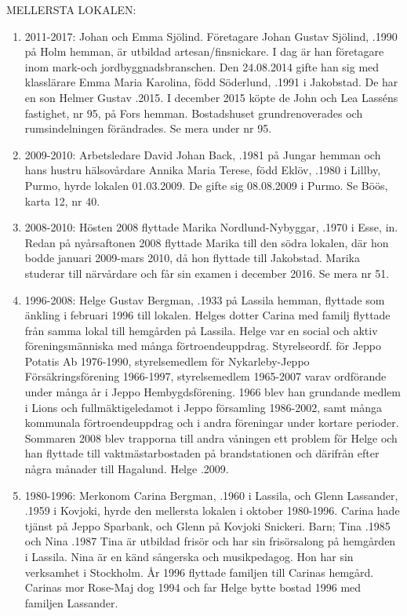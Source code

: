 MELLERSTA LOKALEN:
\begin{enumerate}
  \item 2011-2017: Johan och Emma Sjölind. Företagare Johan Gustav Sjölind, .1990 på Holm hemman, är utbildad artesan/finsnickare. I dag är han företagare inom mark-och jordbyggnadsbranschen. Den 24.08.2014 gifte han sig med klasslärare Emma Maria Karolina, född Söderlund, .1991 i Jakobstad. De har	en son Helmer Gustav .2015. I december 2015 köpte de John och Lea Lasséns fastighet, nr 95, på Fors hemman. Bostadshuset grundrenoverades och rumsindelningen förändrades. Se mera under nr 95.
  \item 2009-2010: Arbetsledare David Johan Back, .1981 på Jungar hemman och hans hustru hälsovårdare Annika Maria Terese, född Eklöv, .1980 i Lillby, Purmo, hyrde lokalen 01.03.2009. De gifte sig 08.08.2009 i Purmo. Se Böös, karta 12, nr 40.
  \item 2008-2010: 	Hösten 2008 flyttade Marika Nordlund-Nybyggar, .1970 i Esse, in. Redan på nyårsaftonen 2008 flyttade Marika till den södra lokalen, där hon bodde januari 2009-mars 2010, då hon flyttade till Jakobstad. Marika studerar till närvårdare och får sin examen i december 2016. Se mera nr 51.
  \item 1996-2008: 	Helge Gustav Bergman, .1933 på Lassila hemman, flyttade som änkling i februari 1996 till lokalen. Helges dotter Carina med familj flyttade från samma lokal till hemgården på Lassila. Helge var en social och aktiv föreningsmänniska med många förtroendeuppdrag. Styrelseordf. för Jeppo Potatis Ab 1976-1990, styrelsemedlem för Nykarleby-Jeppo Försäkringsförening 1966-1997, styrelsemedlem 1965-2007 varav ordförande under många år i Jeppo Hembygdsförening. 1966 blev han grundande medlem i Lions och fullmäktigeledamot i Jeppo församling 1986-2002, samt många kommunala förtroendeuppdrag och i andra föreningar under kortare perioder. Sommaren 2008 blev trapporna till andra våningen ett problem för Helge och han flyttade till vaktmästarbostaden på brandstationen och därifrån efter några månader till Hagalund. Helge .2009.
  \item 1980-1996: Merkonom Carina Bergman, .1960 i Lassila, och Glenn Lassander, .1959 i Kovjoki, hyrde den mellersta lokalen i oktober 1980-1996. Carina hade tjänst på Jeppo Sparbank, och Glenn på Kovjoki Snickeri.
  Barn;	Tina .1985 och	Nina .1987
  Tina är utbildad frisör och har sin frisörsalong på hemgården i Lassila. Nina är en känd sångerska och musikpedagog. Hon har sin verksamhet i Stockholm. År 1996 flyttade familjen till Carinas hemgård. Carinas mor Rose-Maj dog 1994 och far Helge bytte bostad 1996 med familjen Lassander.

\end{enumerate}

